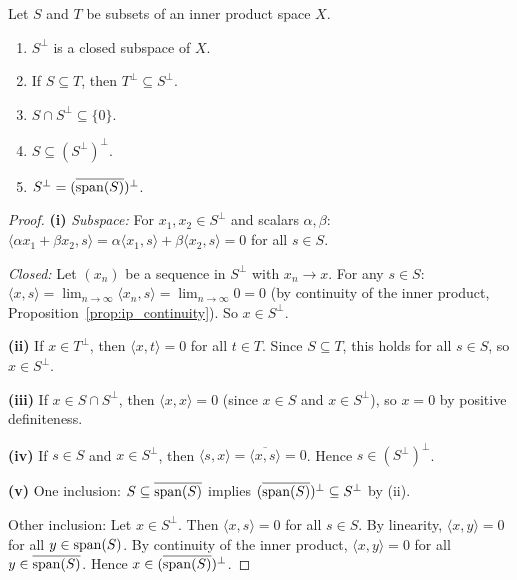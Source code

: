 \documentclass[11pt,a4paper]{article}
\begin{document}
\begin{proposition}
\label{prop:orth_complement}
Let $S$ and $T$ be subsets of an inner product space $X$.
\begin{enumerate}[label=(\roman*),nosep]
    \item $S^\perp$ is a closed subspace of $X$.
    \item If $S \subseteq T$, then $T^\perp \subseteq S^\perp$.
    \item $S \cap S^\perp \subseteq \{0\}$.
    \item $S \subseteq (S^\perp)^\perp$.
    \item $S^\perp = (\overline{\operatorname{span}(S)})^\perp$.
\end{enumerate}
\end{proposition}

\begin{proof}
\textbf{(i)} \emph{Subspace:} For $x_1, x_2 \in S^\perp$ and scalars
$\alpha, \beta$: $\langle \alpha x_1 + \beta x_2, s \rangle =
\alpha \langle x_1, s \rangle + \beta \langle x_2, s \rangle = 0$ for
all $s \in S$.

\emph{Closed:} Let $(x_n)$ be a sequence in $S^\perp$ with $x_n \to x$.
For any $s \in S$: $\langle x, s \rangle = \lim_{n \to \infty}
\langle x_n, s \rangle = \lim_{n \to \infty} 0 = 0$ (by continuity of the
inner product, Proposition~\ref{prop:ip_continuity}). So $x \in S^\perp$.

\textbf{(ii)} If $x \in T^\perp$, then $\langle x, t \rangle = 0$ for all
$t \in T$. Since $S \subseteq T$, this holds for all $s \in S$, so
$x \in S^\perp$.

\textbf{(iii)} If $x \in S \cap S^\perp$, then $\langle x, x \rangle = 0$
(since $x \in S$ and $x \in S^\perp$), so $x = 0$ by positive definiteness.

\textbf{(iv)} If $s \in S$ and $x \in S^\perp$, then
$\langle s, x \rangle = \overline{\langle x, s \rangle} = 0$. Hence
$s \in (S^\perp)^\perp$.

\textbf{(v)} One inclusion: $S \subseteq \overline{\operatorname{span}(S)}$ implies
$(\overline{\operatorname{span}(S)})^\perp \subseteq S^\perp$ by (ii).

Other inclusion: Let $x \in S^\perp$. Then $\langle x, s \rangle = 0$ for
all $s \in S$. By linearity, $\langle x, y \rangle = 0$ for all
$y \in \operatorname{span}(S)$. By continuity of the inner product, $\langle x, y \rangle
= 0$ for all $y \in \overline{\operatorname{span}(S)}$. Hence $x \in
(\overline{\operatorname{span}(S)})^\perp$.
\end{proof}
\end{document}
